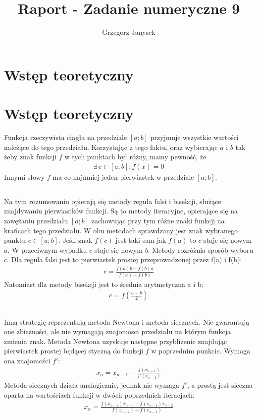 \documentclass[11pt]{extarticle}
\author{Grzegorz Janysek}
\title{Raport - Zadanie numeryczne 9}
\begin{document}
	\maketitle

	\section{Wstęp teoretyczny}
	
	\section{Wstęp teoretyczny}
	Funkcja rzeczywista ciągła na przedziale \([a;b]\) przyjmuje wszystkie wartości należące do tego przedziału.
	Korzystając z tego faktu, oraz wybierając \(a\) i \(b\) tak żeby znak funkcji \(f\) w tych punktach był różny, mamy pewność, że 
	\begin{align}
		\exists \,c \in [a;b] : f(x) = 0
	\end{align}
	Innymi słowy \(f\) ma co najmniej jeden pierwiastek w przedziale \([a;b]\).
	
	\subsection{}
	Na tym rozumowaniu opierają się metody reguła falsi i bisekcji, służące znajdywaniu pierwiastków funkcji.
	Są to metody iteracyjne, opierające się na zawężaniu przedziału \([a;b]\) zachowując przy tym różne znaki funkcji na krańcach tego przedziału.
	W obu metodach sprawdzany jest znak wybranego punktu \(c \in [a;b]\).
	Jeśli znak \(f(c)\) jest taki sam jak \(f(a)\) to \(c\) staje się nowym \(a\).
	W przeciwnym wypadku \(c\) staje się nowym \(b\). Metody rozróżnia sposób wyboru \(c\).
	Dla regula falsi jest to pierwiastek prostej przeprowadzonej przez f(a) i f(b):
	\begin{align}
		c = \frac{ f(a)b - f(b)a }{ f(a) - f(b) }
	\end{align}
	Natomiast dla metody bisekcji jest to średnia arytmetyczna a i b:
	\begin{align}
		c = f\left(\frac{a+b}{2}\right)
	\end{align}
	
	\subsection{}
	Inną strategię reprezentują metoda Newtona i metoda siecznych.
	Nie gwarantują one zbieżności, ale nie wymagają znajomosci przedziału na którym funkcja zmienia znak.
	Metoda Newtona uzyskuje następne przybliżenie znajdując pierwiastek prostej będącej styczną do funkcji \(f\) w poprzednim punkcie. Wymaga ona znajomości \(f'\):
	\begin{align}
		x_{n} = x_{n-1} - \frac{f(x_{n-1})}{f'(x_{n-1})}
	\end{align}
	Metoda siecznych działa analogicznie, jednak nie wymaga \(f'\), a prostą jest sieczna oparta na wartościach funkcji w dwóch poprzednich iteracjach:
	\begin{align}
		x_{n} = \frac{ f(x_{n-2})x_{n-1} - f(x_{n-1})x_{n-2} }{ f(x_{n-2}) - f(x_{n-1}) }
	\end{align}
\end{document}
